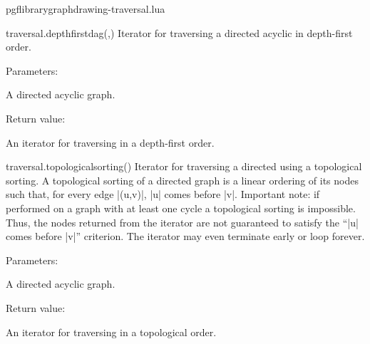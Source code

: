 
\begin{filedescription}{pgflibrarygraphdrawing-traversal.lua}


\begin{luacommand}{{traversal.depth\textunderscore{}first\textunderscore{}dag}(,)}
Iterator for traversing a directed acyclic  in depth-first order. 

Parameters:
\begin{parameterdescription}
	\item[\meta{graph}] A directed acyclic graph. 
\end{parameterdescription}


Return value:
\begin{parameterdescription} 
  \item[] An iterator for traversing  in a depth-first order. 
\end{parameterdescription}


\end{luacommand}
\begin{luacommand}{{traversal.topological\textunderscore{}sorting}()}
Iterator for traversing a directed  using a topological sorting.  A topological sorting of a directed graph is a linear ordering of its nodes such that, for every edge |(u,v)|, |u| comes before |v|.  Important note: if performed on a graph with at least one cycle a topological sorting is impossible. Thus, the nodes returned from the iterator are not guaranteed to satisfy the ``|u| comes before |v|'' criterion. The iterator may even terminate early or loop forever. 

Parameters:
\begin{parameterdescription}
	\item[\meta{graph}] A directed acyclic graph. 
\end{parameterdescription}


Return value:
\begin{parameterdescription} 
  \item[] An iterator for traversing  in a topological order. 
\end{parameterdescription}


\end{luacommand}

\end{filedescription}